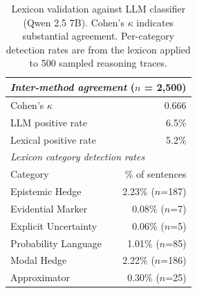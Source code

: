 \begin{table}[t]
\centering
\caption{Lexicon validation against LLM classifier (Qwen 2.5 7B). Cohen's $\kappa$ indicates substantial agreement. Per-category detection rates are from the lexicon applied to 500 sampled reasoning traces.}
\label{tab:validation}
\small
\begin{tabular}{lr}
\toprule
\multicolumn{2}{l}{\textit{Inter-method agreement} ($n$ = 2{,}500)} \\
\midrule
Cohen's $\kappa$ & 0.666 \\
LLM positive rate & 6.5\% \\
Lexical positive rate & 5.2\% \\
\midrule
\multicolumn{2}{l}{\textit{Lexicon category detection rates}} \\
\midrule
Category & \% of sentences \\
\midrule
Epistemic Hedge & 2.23\% ($n$=187) \\
Evidential Marker & 0.08\% ($n$=7) \\
Explicit Uncertainty & 0.06\% ($n$=5) \\
Probability Language & 1.01\% ($n$=85) \\
Modal Hedge & 2.22\% ($n$=186) \\
Approximator & 0.30\% ($n$=25) \\
\bottomrule
\end{tabular}
\end{table}